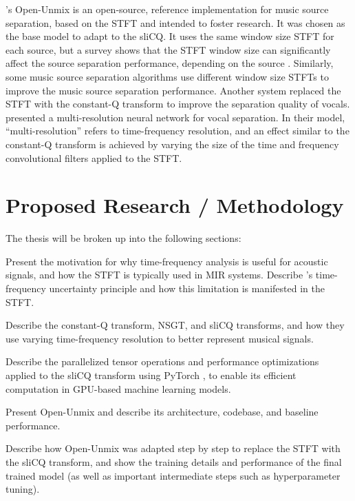 \documentclass[letter,12pt]{scrartcl}
\newenvironment{tight_enumerate}{
\begin{enumerate}
  \setlength{\itemsep}{0pt}
  \setlength{\parskip}{0pt}
}{\end{enumerate}}
\begin{document}
\citet{umx}'s Open-Unmix is an open-source, reference implementation for music source separation, based on the STFT and intended to foster research. It was chosen as the base model to adapt to the sliCQ. It uses the same window size STFT for each source, but a survey shows that the STFT window size can significantly affect the source separation performance, depending on the source \cite{tftradeoff1}. Similarly, some music source separation algorithms \cite{fitzgerald1, driedger} use different window size STFTs to improve the music source separation performance. Another system \cite{fitzgerald2} replaced the STFT with the constant-Q transform to improve the separation quality of vocals. \citet{plumbley2} presented a multi-resolution neural network for vocal separation. In their model, ``multi-resolution'' refers to time-frequency resolution, and an effect similar to the constant-Q transform is achieved by varying the size of the time and frequency convolutional filters applied to the STFT.

\section{Proposed Research / Methodology}

The thesis will be broken up into the following sections:
\begin{tight_enumerate}
	\item
		Present the motivation for why time-frequency analysis is useful for acoustic signals, and how the STFT is typically used in MIR systems. Describe \citet{gabor1946}'s time-frequency uncertainty principle and how this limitation is manifested in the STFT.
	\item
		Describe the constant-Q transform, NSGT, and sliCQ transforms, and how they use varying time-frequency resolution to better represent musical signals.
	\item
		Describe the parallelized tensor operations and performance optimizations applied to the sliCQ transform using PyTorch \cite{pytorch}, to enable its efficient computation in GPU-based machine learning models.
	\item
		Present Open-Unmix and describe its architecture, codebase, and baseline performance.
	\item
		Describe how Open-Unmix was adapted step by step to replace the STFT with the sliCQ transform, and show the training details and performance of the final trained model (as well as important intermediate steps such as hyperparameter tuning).
\end{tight_enumerate}
\end{document}
